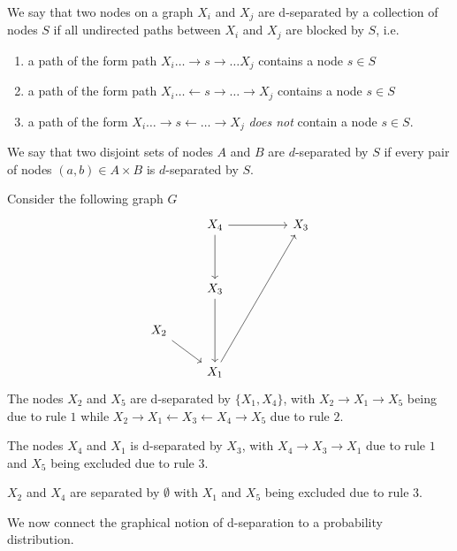 \documentclass[../main.tex]{subfiles}
\begin{document}
    \begin{defn}\label{defn:d-separation}
    We say that two nodes on a graph ${X_i}$ and ${X_j}$ are d-separated by a collection of nodes ${S}$ if all undirected paths between ${X_i}$ and ${X_j}$ are blocked by ${S}$, i.e.
    \begin{enumerate}
        \item a path of the form path ${X_i \dots \rightarrow s \rightarrow \dots  X_j}$ contains a node ${s\in S}$ 
        \item a path of the form path ${X_i\dots \leftarrow s \rightarrow \dots \rightarrow X_j}$ contains a node ${s\in S}$ 
        \item a path of the form  ${X_i\dots \rightarrow s \leftarrow \dots \rightarrow X_j}$ \emph{does not} contain a node ${s\in S}$.  
    \end{enumerate}
    We say that two disjoint sets of nodes ${A}$ and ${B}$ are ${d}$-separated by ${S}$ if every pair of nodes ${(a,b)\in A\times B}$ is ${d}$-separated by ${S}$.       
    \end{defn}
    \begin{ex}[d-separation]\label{ex:d-separation}
    Consider the following graph $G$ 
    \[\begin{tikzcd}
        & {X_4} && {X_3} \\
        \\
        & {X_3} \\
        {X_2} \\
        & {X_1}
        \arrow[from=1-2, to=1-4]
        \arrow[from=1-2, to=3-2]
        \arrow[from=3-2, to=5-2]
        \arrow[from=4-1, to=5-2]
        \arrow[from=5-2, to=1-4]
    \end{tikzcd}\]
    The nodes ${X_2}$ and ${X_5}$ are d-separated by ${\{X_1,X_4\}}$, with ${X_2\to X_1\to X_5}$ being due to rule ${1}$ while ${X_2\to X_1\leftarrow X_3\leftarrow X_4\to X_5}$ due to rule ${2}$. 
    
    The nodes ${X_4}$ and ${X_1}$ is d-separated by ${X_3}$, with ${X_4\to X_3\to X_1}$ due to rule ${1}$ and ${X_5}$ being excluded due to rule ${3}$. 
    
    ${X_2}$ and ${X_4}$ are separated by ${\emptyset}$ with ${X_1}$ and ${X_5}$ being excluded due to rule ${3}$.   
    \end{ex}
    
    We now connect the graphical notion of d-separation to a probability distribution. 
    
\end{document}
